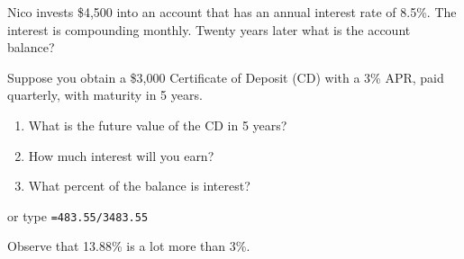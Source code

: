 \begin{sol}
 


 

\end{sol}


\begin{stmt}
Nico invests \$4,500 into an account that has an annual interest rate of 8.5\%. The interest is compounding monthly. Twenty years later what is the account balance?
\end{stmt}

\begin{sol}

\end{sol}


\begin{stmt}
Suppose you obtain a \$3,000 Certificate of Deposit (CD) with a 3\% APR, paid quarterly, with maturity in 5 years.
\begin{enumerate}[label=(\alph*), leftmargin=2em, topsep=2pt, itemsep=1pt]
\item What is the future value of the CD in 5 years?
\item How much interest will you earn?
\item What percent of the balance is interest?
\end{enumerate}
\end{stmt}

\begin{sol}
 


 


 


or type \texttt{=483.55/3483.55}

Observe that 13.88\% is a lot more than 3\%.
\end{sol}

